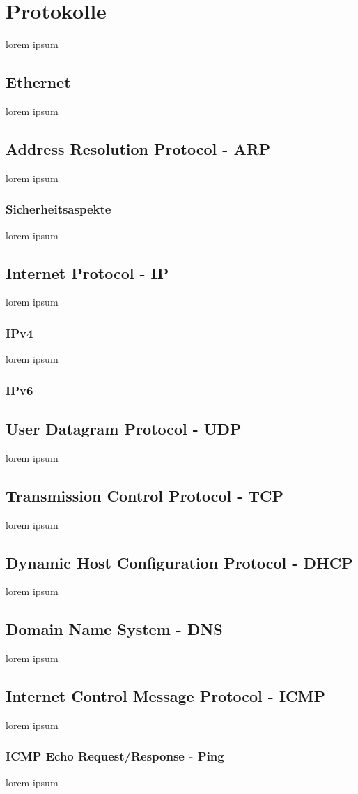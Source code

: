 \documentclass[12pt,a4paper]{report}
\begin{document}
\section{Protokolle}
lorem ipsum
\subsection{Ethernet}\label{ssec:eth}
lorem ipsum
\subsection{Address Resolution Protocol - ARP}\label{ssec:arp}
lorem ipsum
\subsubsection{Sicherheitsaspekte}
lorem ipsum
\subsection{Internet Protocol - IP}\label{ssec:ip}
lorem ipsum
\subsubsection{IPv4}
lorem ipsum
\subsubsection{IPv6}
\subsection{User Datagram Protocol - UDP}
lorem ipsum
\subsection{Transmission Control Protocol - TCP}
lorem ipsum
\subsection{Dynamic Host Configuration Protocol - DHCP}
lorem ipsum
\subsection{Domain Name System - DNS}
lorem ipsum
\subsection{Internet Control Message Protocol - ICMP}
lorem ipsum 
\subsubsection{ICMP Echo Request/Response - Ping}
lorem ipsum
\end{document}
